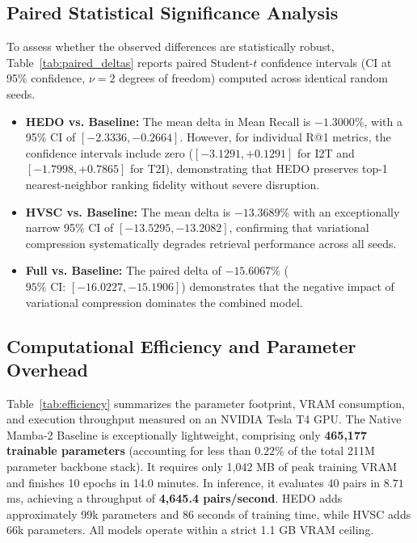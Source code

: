 \documentclass[journal]{IEEEtran}
\begin{document}
\subsection{Paired Statistical Significance Analysis}
To assess whether the observed differences are statistically robust, Table~\ref{tab:paired_deltas} reports paired Student-$t$ confidence intervals (CI at 95\% confidence, $\nu = 2$ degrees of freedom) computed across identical random seeds.
\begin{itemize}
    \item \textbf{HEDO vs. Baseline:} The mean delta in Mean Recall is $-1.3000\%$, with a 95\% CI of $[-2.3336, -0.2664]$. However, for individual R@1 metrics, the confidence intervals include zero ($[-3.1291, +0.1291]$ for I2T and $[-1.7998, +0.7865]$ for T2I), demonstrating that HEDO preserves top-1 nearest-neighbor ranking fidelity without severe disruption.
    \item \textbf{HVSC vs. Baseline:} The mean delta is $-13.3689\%$ with an exceptionally narrow 95\% CI of $[-13.5295, -13.2082]$, confirming that variational compression systematically degrades retrieval performance across all seeds.
    \item \textbf{Full vs. Baseline:} The paired delta of $-15.6067\%$ ($95\%\text{ CI: } [-16.0227, -15.1906]$) demonstrates that the negative impact of variational compression dominates the combined model.
\end{itemize}

\subsection{Computational Efficiency and Parameter Overhead}
Table~\ref{tab:efficiency} summarizes the parameter footprint, VRAM consumption, and execution throughput measured on an NVIDIA Tesla T4 GPU.
The Native Mamba-2 Baseline is exceptionally lightweight, comprising only \textbf{465,177 trainable parameters} (accounting for less than $0.22\%$ of the total 211M parameter backbone stack). It requires only 1,042 MB of peak training VRAM and finishes 10 epochs in 14.0 minutes. In inference, it evaluates 40 pairs in $8.71$ ms, achieving a throughput of \textbf{4,645.4 pairs/second}. HEDO adds approximately 99k parameters and 86 seconds of training time, while HVSC adds 66k parameters. All models operate within a strict 1.1 GB VRAM ceiling.
\end{document}
